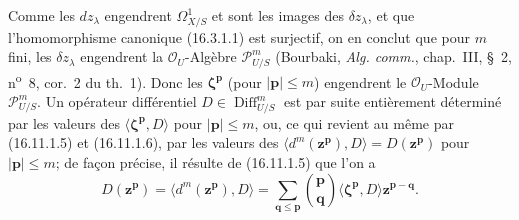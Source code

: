 \begin{env}[16.11.1]
Comme les $dz_\lambda$ engendrent $\varOmega_{X/S}^1$ et sont les images des
$\delta z_\lambda$, et que l'homomorphisme canonique (16.3.1.1) est
surjectif, on en conclut que pour $m$ fini, les $\delta z_\lambda$ engendrent
la $\mathcal{O}_U$-Algèbre $\mathscr{P}_{U/S}^m$ (Bourbaki,
\emph{Alg. comm.}, chap.~III, §~2, n\textsuperscript{o}~8, cor.~2 du th.~1).
Donc les $\boldsymbol{\zeta}^{\mathbf{p}}$ (pour $|\mathbf{p}|\leq m$)
engendrent le $\mathcal{O}_U$-Module $\mathscr{P}_{U/S}^m$. Un opérateur
différentiel $D\in\operatorname{Diff}_{U/S}^m$ est par suite entièrement
déterminé par les valeurs des
$\langle\boldsymbol{\zeta}^{\mathbf{p}},D\rangle$ pour
$|\mathbf{p}|\leq m$, ou, ce qui revient au même par (16.11.1.5) et
(16.11.1.6), par les valeurs
des $\langle d^m(\mathbf{z}^{\mathbf{p}}),D\rangle=D(\mathbf{z}^{\mathbf{p}})$
pour $|\mathbf{p}|\leq m$; de façon précise, il résulte de (16.11.1.5) que
l'on a
\[
  D(\mathbf{z}^{\mathbf{p}})
  =\langle d^m(\mathbf{z}^{\mathbf{p}}),D\rangle
  =\sum_{\mathbf{q}\leq\mathbf{p}}
    \binom{\mathbf{p}}{\mathbf{q}}
    \langle\boldsymbol{\zeta}^{\mathbf{p}},D\rangle
    \mathbf{z}^{\mathbf{p}-\mathbf{q}}.
  \tag{16.11.1.7}
  \label{IV.16.11.1.7}
\]
\end{env}

